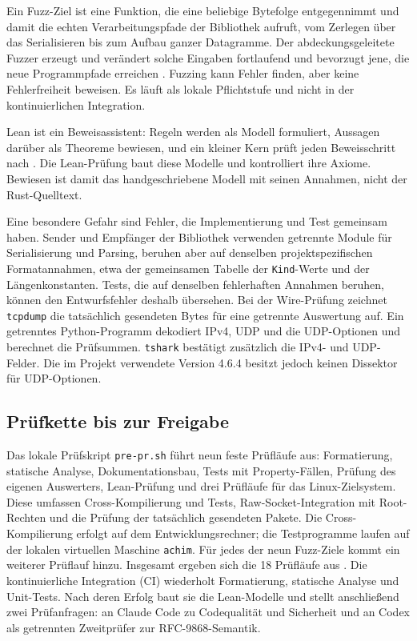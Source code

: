 Ein Fuzz-Ziel ist eine Funktion, die eine
beliebige Bytefolge entgegennimmt und damit die echten Verarbeitungspfade der Bibliothek aufruft, vom
Zerlegen über das Serialisieren bis zum Aufbau ganzer Datagramme. Der abdeckungsgeleitete Fuzzer erzeugt
und verändert solche Eingaben fortlaufend und bevorzugt jene, die neue Programmpfade erreichen
\cite{cargo-fuzz,libfuzzer}. Fuzzing kann Fehler finden, aber keine Fehlerfreiheit beweisen. Es läuft als
lokale Pflichtstufe und nicht in der kontinuierlichen Integration.

Lean ist ein Beweisassistent: Regeln werden als Modell formuliert, Aussagen darüber als Theoreme bewiesen, und ein
kleiner Kern prüft jeden Beweisschritt nach \cite{lean4}. Die Lean-Prüfung baut diese Modelle und
kontrolliert ihre Axiome. Bewiesen ist damit das handgeschriebene Modell mit seinen Annahmen, nicht der
Rust-Quelltext.

Eine besondere Gefahr sind Fehler, die Implementierung und Test gemeinsam haben. Sender und Empfänger der
Bibliothek verwenden getrennte Module für Serialisierung und Parsing, beruhen aber auf denselben
projektspezifischen Formatannahmen, etwa der gemeinsamen Tabelle der \texttt{Kind}-Werte und der
Längenkonstanten. Tests, die auf denselben fehlerhaften Annahmen beruhen, können den Entwurfsfehler deshalb
übersehen. Bei der Wire-Prüfung zeichnet \texttt{tcpdump} die tatsächlich gesendeten Bytes für eine
getrennte Auswertung auf. Ein getrenntes Python-Programm dekodiert IPv4, UDP und die UDP-Optionen und
berechnet die Prüfsummen.
\texttt{tshark} bestätigt zusätzlich die IPv4- und UDP-Felder. Die im Projekt verwendete Version 4.6.4
besitzt jedoch keinen Dissektor für UDP-Optionen.

\subsection{Prüfkette bis zur Freigabe}

Das lokale Prüfskript \texttt{pre-pr.sh} führt neun feste Prüfläufe aus: Formatierung, statische Analyse,
Dokumentationsbau, Tests mit Property-Fällen, Prüfung des eigenen Auswerters, Lean-Prüfung und drei
Prüfläufe für das Linux-Zielsystem. Diese umfassen Cross-Kompilierung und Tests, Raw-Socket-Integration mit
Root-Rechten und die Prüfung der tatsächlich gesendeten Pakete. Die Cross-Kompilierung erfolgt auf dem
Entwicklungsrechner; die Testprogramme laufen auf der lokalen virtuellen Maschine \texttt{achim}.
Für jedes der neun Fuzz-Ziele kommt ein weiterer Prüflauf hinzu.
Insgesamt ergeben sich die 18 Prüfläufe aus . Die kontinuierliche Integration (CI)
wiederholt Formatierung, statische Analyse und Unit-Tests. Nach deren Erfolg baut sie die Lean-Modelle und
stellt anschließend zwei Prüfanfragen: an Claude Code zu Codequalität und Sicherheit und an Codex als
getrennten Zweitprüfer zur RFC-9868-Semantik.

